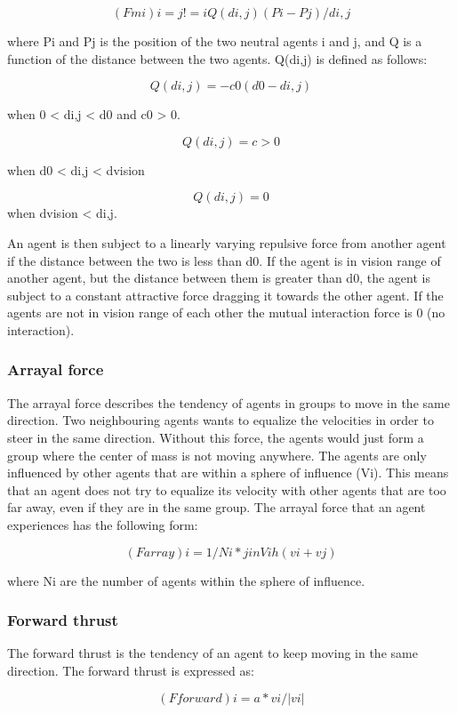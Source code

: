 \documentclass[paper=a4, fontsize=11pt,twoside]{scrartcl}		%
\begin{document}
\begin{flushleft}
$$(Fmi)i = j!=iQ(di,j)(Pi - Pj)/di,j$$

where Pi and Pj is the position of the two neutral agents i and j, and Q is a function of the distance between the two agents. Q(di,j) is defined as follows:

$$Q(di,j) = -c0(d0-di,j)$$     

when 0 < di,j < d0 and c0 > 0.

$$Q(di,j) = c > 0$$

when d0  < di,j < dvision

$$Q(di,j) = 0$$
when dvision < di,j. \newline

An agent is then subject to a linearly varying repulsive force from another agent if the distance between the two is less than d0. If the agent is in vision range of another agent, but the distance between them is greater than d0, the agent is subject to a constant attractive force dragging it towards the other agent. If the agents are not in vision range of each other the mutual interaction force is 0 (no interaction).

\subsubsection{Arrayal force} 

The arrayal force describes the tendency of agents in groups to move in the same direction. Two neighbouring agents wants to equalize the velocities in order to steer in the same direction. Without this force, the agents would just form a group where the center of mass is not moving anywhere. The agents are only influenced by other agents that are within a sphere of influence (Vi). This means that an agent does not try to equalize its velocity with other agents that are too far away, even if they are in the same group. The arrayal force that an agent experiences has the following form:

$$(Farray)i = 1/Ni *j in Vih(vi+vj)$$

where Ni are the number of agents within the sphere of influence.

\subsubsection{Forward thrust}

The forward thrust is the tendency of an agent to keep moving in the same direction. The forward thrust is expressed as:

$$(Fforward)i = a*vi/|vi|$$


\end{flushleft}
\end{document}
